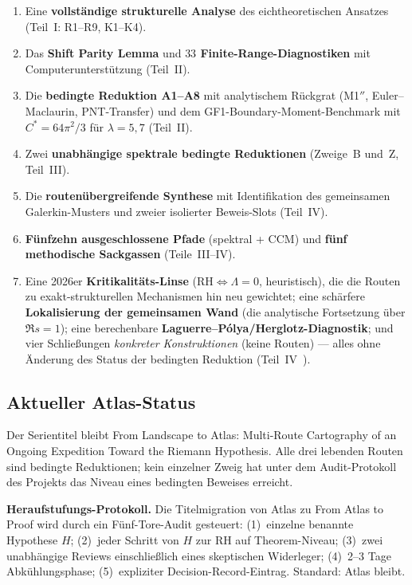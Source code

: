 \documentclass[12pt,a4paper]{article}
\theoremstyle{definition}
\theoremstyle{remark}
\begin{document}
\begin{enumerate}
  \item Eine \textbf{vollständige strukturelle Analyse} des
    eichtheoretischen Ansatzes (Teil~I: R1--R9, K1--K4).
  \item Das \textbf{Shift Parity Lemma} und \textbf{$33$ Finite-Range-Diagnostiken}
    mit Computerunterstützung (Teil~II).
  \item Die \textbf{bedingte Reduktion A1--A8} mit analytischem
    Rückgrat (M1$''$, Euler--Maclaurin, PNT-Transfer) und dem
    GF1-Boundary-Moment-Benchmark mit $C^* = 64\pi^2/3$ für
    $\lambda=5,7$ (Teil~II).
  \item Zwei \textbf{unabhängige spektrale bedingte Reduktionen}
    (Zweige~B und~Z, Teil~III).
  \item Die \textbf{routenübergreifende Synthese} mit Identifikation
    des gemeinsamen Galerkin-Musters und zweier isolierter Beweis-Slots
    (Teil~IV).
  \item \textbf{Fünfzehn ausgeschlossene Pfade} (spektral + CCM) und
    \textbf{fünf methodische Sackgassen} (Teile~III--IV).
  \item Eine 2026er \textbf{Kritikalitäts-Linse} ($\mathrm{RH}\Leftrightarrow\Lambda=0$,
    heuristisch), die die Routen zu exakt-strukturellen Mechanismen hin neu
    gewichtet; eine schärfere \textbf{Lokalisierung der gemeinsamen Wand} (die
    analytische Fortsetzung über $\Re s=1$); eine berechenbare
    \textbf{Laguerre--P\'olya/Herglotz-Diagnostik}; und vier Schließungen
    \emph{konkreter Konstruktionen} (keine Routen) --- alles ohne Änderung des
    Status der bedingten Reduktion (Teil~IV~\cite{Geiger2026partIV}).
\end{enumerate}


\subsection{Aktueller Atlas-Status}

Der Serientitel bleibt \glqq From Landscape to Atlas: Multi-Route
Cartography of an Ongoing Expedition Toward the Riemann Hypothesis.\grqq{}
Alle drei lebenden Routen sind bedingte Reduktionen; kein einzelner Zweig
hat unter dem Audit-Protokoll des Projekts das Niveau eines bedingten
Beweises erreicht.

\textbf{Heraufstufungs-Protokoll.} Die Titelmigration von \glqq Atlas\grqq{}
zu \glqq From Atlas to Proof\grqq{} wird durch ein Fünf-Tore-Audit
gesteuert:
(1)~einzelne benannte Hypothese $H$;
(2)~jeder Schritt von $H$ zur RH auf Theorem-Niveau;
(3)~zwei unabhängige Reviews einschließlich eines skeptischen Widerleger;
(4)~2--3 Tage Abkühlungsphase;
(5)~expliziter Decision-Record-Eintrag.
Standard: Atlas bleibt.
\end{document}
